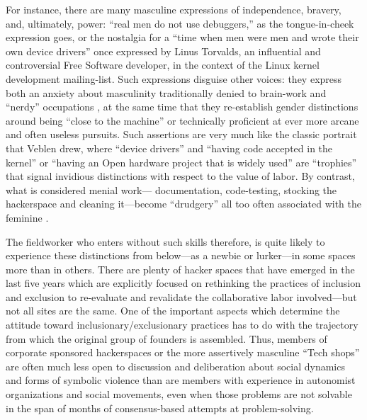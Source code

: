 \documentclass[10pt,letter,oneside]{scrartcl}
\begin{document}
For instance, there are many masculine expressions of independence,
bravery, and, ultimately, power: ``real men do not use debuggers,'' as
the tongue-in-cheek expression goes, or the nostalgia for a ``time when
men were men and wrote their own device drivers'' once expressed by
Linus Torvalds, an influential and controversial Free Software
developer, in the context of the Linux kernel development mailing-list.  
Such expressions disguise other voices: they express both an anxiety about 
masculinity traditionally denied to brain-work and ``nerdy'' occupations 
\cite{Nugent2008}, at the same time that they re-establish gender distinctions 
around being ``close to the machine'' \cite{Ullman1997} or technically 
proficient at ever more arcane and often useless pursuits.  Such assertions 
are very much like the classic portrait that Veblen drew, where ``device drivers'' 
and ``having code accepted in the kernel'' or ``having an Open hardware
project that is widely used'' are ``trophies'' that signal invidious
distinctions with respect to the value of labor.  By contrast, what is
considered menial work--- documentation, code-testing, stocking the
hackerspace and cleaning it---become ``drudgery'' all too often associated 
with the feminine \cite{Veblen1934}.

The fieldworker who enters without such skills therefore, is quite
likely to experience these distinctions from below---as a newbie or
lurker---in some spaces more than in others.  There are plenty of
hacker spaces that have emerged in the last five years which are explicitly 
focused on rethinking the practices of inclusion and exclusion to re-evaluate 
and revalidate the collaborative labor involved---but not all sites are the same. 
One of the important aspects which determine the attitude toward inclusionary/exclusionary
practices has to do with the trajectory from which the original group of 
founders is assembled. Thus, members of corporate sponsored hackerspaces or 
the more assertively masculine ``Tech shops'' are often much less open to 
discussion and deliberation about social dynamics and forms of symbolic violence 
than are members with experience in autonomist organizations and social movements, 
even when those problems are not solvable in the span of months of consensus-based 
attempts at problem-solving.
\end{document}
